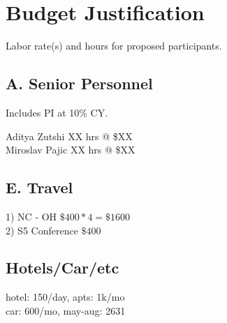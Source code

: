 \section{Budget Justification }

Labor rate(s) and hours for proposed participants.





\subsection{A. Senior Personnel}
 Includes PI at 10\% CY.

Aditya Zutshi XX hrs @ \$XX \\
Miroslav Pajic XX hrs @ \$XX \\


\subsection{E. Travel}
1) NC - OH $\$400 * 4 = \$1600$\\
2) S5 Conference $\$400$

%

\subsection{Hotels/Car/etc}
hotel: 150/day, apts: 1k/mo \\
car: 600/mo, may-aug: 2631
